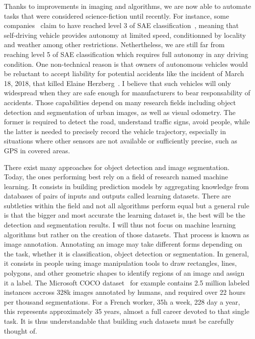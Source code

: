 Thanks to improvements in imaging and algorithms,
we are now able to automate tasks that were considered science-fiction until recently.
For instance, some companies~\cite{audia8} claim to have reached level 3
of SAE classification~\cite{sae-cars},
meaning that self-driving vehicle provides autonomy at limited speed,
conditionned by locality and weather among other restrictions.
Nethertheless, we are still far from reaching level 5 of SAE classification
which requires full autonomy in any driving condition.
One non-technical reason is that owners of autonomous vehicles would be reluctant
to accept liability for potential accidents like the incident
of March 18, 2018, that killed Elaine Herzberg~\cite{elaineherzberg}.
I believe that such vehicles will only widespread when they are
safe enough for manufacturers to bear responsability of accidents.
Those capabilities depend on many research fields
including object detection and segmentation of urban images,
as well as visual odometry.
The former is required to detect the road, understand traffic signs,
avoid people, while the latter is needed to precisely record
the vehicle trajectory, especially in situations where other sensors
are not available or sufficiently precise, such as GPS in covered areas.

There exist many approaches for object detection and image segmentation.
Today, the ones performing best rely on a field of research named machine learning.
It consists in building prediction models by aggregating knowledge
from databases of pairs of inputs and outputs called learning datasets.
There are subtleties within the field
and not all algorithms perform equal but a general rule is that
the bigger and most accurate the learning dataset is,
the best will be the detection and segmentation results.
I will thus not focus on machine learning algorithms
but rather on the creation of those datasets.
That process is known as image annotation.
Annotating an image may take different forms depending on the task,
whether it is classification, object detection or segmentation.
In general, it consists in people using image manipulation tools
to draw rectangles, lines, polygons, and other geometric shapes
to identify regions of an image and assign it a label.
The Microsoft COCO dataset~\cite{lin2014microsoft} for example
contains 2.5 million labeled instances accross 328k images annotated by humans,
and required over 22 hours per thousand segmentations.
For a French worker, 35h a week, 228 day a year, this represents approximately 35 years,
almost a full career devoted to that single task.
It is thus understandable that building such datasets must be carefully thought of.


